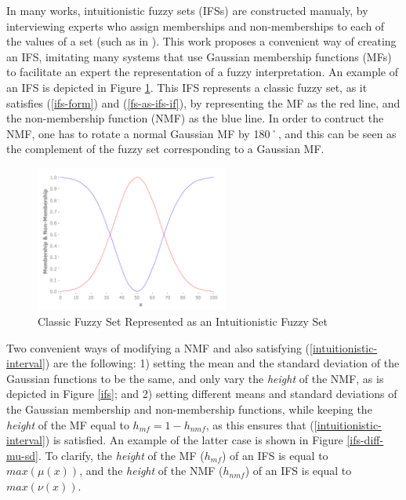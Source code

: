 \documentclass[conference]{IEEEtran}
\begin{document}



In many works, intuitionistic fuzzy sets (IFSs) are constructed manualy,
by interviewing experts who assign memberships and
non-memberships to each of the values of a set (such as in %
\cite{davarzani2013novel}). This work proposes a convenient way of
creating an IFS, imitating many systems that use Gaussian
membership functions (MFs) to facilitate an expert the representation of a
fuzzy interpretation. An example of an IFS is depicted in
Figure \ref{fs-as-ifs}. This IFS represents a classic fuzzy set, as it
satisfies (\ref{ifs-form}) and (\ref{fs-as-ifs-if}), by representing
the MF as the red line, and the non-membership
function (NMF) as the blue line. In order to contruct the NMF, one has
to rotate a normal Gaussian MF by 180˚, and this can be seen as the
complement of the fuzzy set corresponding to a Gaussian MF.

\begin{figure}[!t]
  \centering
  \includegraphics[width=2.5in]{fs-as-ifs}
  \caption{Classic Fuzzy Set Represented as an Intuitionistic Fuzzy Set}
  \label{fs-as-ifs}
\end{figure}

Two convenient ways of modifying a NMF and also
satisfying (\ref{intuitionistic-interval}) are the following: 1) setting
the mean and the standard deviation of the Gaussian functions to be
the same, and only vary the \textit{height} of the NMF,
as is depicted in Figure \ref{ifs}; and 2) setting different means and
standard deviations of the Gaussian membership and non-membership
functions, while keeping the \textit{height} of the MF equal
to $h_{mf} = 1 - h_{nmf}$, as this ensures that
(\ref{intuitionistic-interval}) is satisfied. An example of the latter
case is shown in Figure \ref{ifs-diff-mu-sd}. To clarify, the \textit{height}
of the MF ($h_{mf}$) of an IFS is equal to $max(\mu(x))$, and the
\textit{height} of the NMF ($h_{nmf}$) of an IFS is equal to $max(\nu(x))$.
\end{document}
